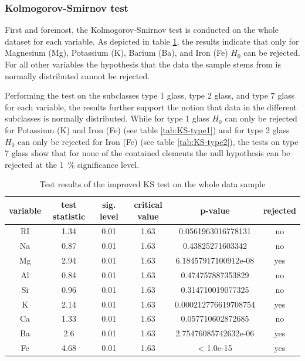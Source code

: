 \documentclass[a4paper, 12pt, titlepage, headsepline, listof = totoc, bibliography = totoc, numbers = noenddot]{scrartcl}
\begin{document}
\subsubsection{Kolmogorov-Smirnov test}



First and foremost, the Kolmogorov-Smirnov test is conducted on the whole dataset for each variable. As depicted in table \ref{tab:KS-full}, the results indicate that only for Magnesium (Mg), Potassium (K), Barium (Ba), and Iron (Fe) $H_0$ can be rejected. For all other variables the hypothesis that the data the sample stems from is normally distributed cannot be rejected.

Performing the test on the subclasses type 1 glass, type 2 glass, and type 7 glass for each variable, the results further support the notion that data in the different subclasses is normally distributed.
While for type 1 glass $H_0$ can only be rejected for Potassium (K) and Iron (Fe) (see table \ref{tab:KS-type1}) and for type 2 glass $H_0$ can only be rejected for Iron (Fe) (see table \ref{tab:KS-type2}), the tests on type 7 glass show that for none of the contained elements the null hypothesis can be rejected at the 1\, \% significance level.


\begin{table}[h!]
\centering
\begin{tabular}{|cccccc|} \hline variable & test statistic & sig. level & critical value & p-value & rejected\\ \hline RI & 1.34 & 0.01 & 1.63 & 0.0561963016778131 & no\\ 
Na & 0.87 & 0.01 & 1.63 & 0.43825271603342 & no\\ 
Mg & 2.94 & 0.01 & 1.63 & 6.18457917100912e-08 & yes\\ 
Al & 0.84 & 0.01 & 1.63 & 0.474757887353829 & no\\ 
Si & 0.96 & 0.01 & 1.63 & 0.314710019077325 & no\\ 
K & 2.14 & 0.01 & 1.63 & 0.000212776619708754 & yes\\ 
Ca & 1.33 & 0.01 & 1.63 & 0.057710602872685 & no\\ 
Ba & 2.6 & 0.01 & 1.63 & 2.75476085742632e-06 & yes\\ 
Fe & 4.68 & 0.01 & 1.63 & < 1.0e-15 & yes\\ \hline \end{tabular}\caption{Test results of the improved KS test on the whole data sample}
\label{tab:KS-full}
\end{table}
\end{document}
